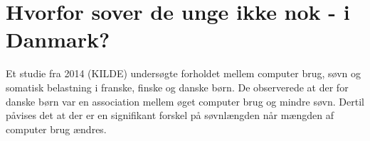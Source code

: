 \section{Hvorfor sover de unge ikke nok - i Danmark?}
\label{sec:hvorforSoverDeUngeIkkeNok}

Et studie fra 2014 (KILDE) undersøgte forholdet mellem computer brug, søvn og somatisk belastning i franske, finske og danske børn. De observerede at der for danske børn var en association mellem øget computer brug og mindre søvn. Dertil påvises det at der er en signifikant forskel på søvnlængden når mængden af computer brug ændres.
